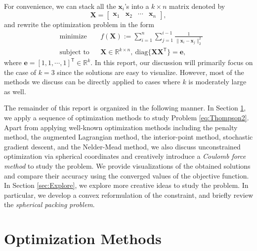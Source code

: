 \documentclass[11pt]{article}
\begin{document}
For convenience, we can stack all the $\bm{x}_i$'s into a $k\times n$ matrix denoted by
$$ \bm{X} = \left[\begin{array}{cccc} \bm{x}_1 & \bm{x}_2 & \cdots & \bm{x}_n \end{array}\right], $$
and rewrite the optimization problem in the form
\begin{equation}\label{eq:Thompson2}
\begin{aligned}
& \text{minimize}
& & f(\bm{X}) := \sum_{i=1}^n\sum_{j=1}^{i-1}\frac{1}{\|\bm{x}_i-\bm{x}_j\|_2^2} \\
& \text{subject to}
& & \bm{X}\in\mathbb{R}^{k\times n},\ \text{diag}\{\bm{X}\bm{X}^\mathsf{T}\} = \bm{e},
\end{aligned}
\end{equation}
where $\bm{e}=[1,1,\cdots,1]^\mathsf{T}\in\mathbb{R}^k$.
In this report, our discussion will primarily focus on the case of $k=3$ since the solutions are easy to visualize. However, most of the methods we discuss can be directly applied to cases where $k$ is moderately large as well.

The remainder of this report is organized in the following manner.
In Section \ref{sec:OptMethods}, we apply a sequence of optimization methods to study Problem \eqref{eq:Thompson2}.
Apart from applying well-known optimization methods including the penalty method, the augmented Lagrangian method, the interior-point method, stochastic gradient descent, and the Nelder-Mead method, we also discuss unconstrained optimization via spherical coordinates and creatively introduce a \emph{Coulomb force method} to study the problem.
We provide visualizations of the obtained solutions and compare their accuracy using the converged values of the objective function.
In Section \ref{sec:Explore}, we explore more creative ideas to study the problem.
In particular, we develop a convex reformulation of the constraint, and briefly review the \emph{spherical packing problem}.



\section{Optimization Methods}\label{sec:OptMethods}
\end{document}

